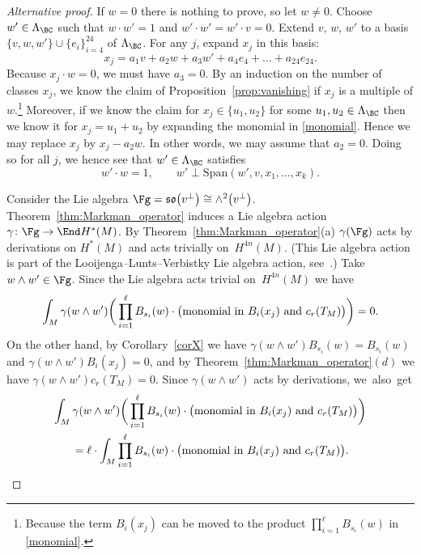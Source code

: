 \begin{proof}[Alternative proof]
If $w=0$ there is nothing to prove, so let $w \neq 0$.
Choose $w' \in \Lambda_{\BC}$ such that $w \cdot w'=1$ and $w' \cdot w' = w' \cdot v = 0$.
Extend $v$, $w$, $w'$ to a basis $\{ v, w, w' \} \cup \{ e_i \}_{i=4}^{24}$ of $\Lambda_{\BC}$.
For any $j$, expand $x_j$ in this basis:
\[
x_j = a_1 v + a_2 w + a_3 w' + a_4 e_4 + \dots + a_{24} e_{24}.
\]
Because $x_j \cdot w=0$, we must have $a_3=0$.
By an induction on the number of classes $x_j$,
we know the claim of Proposition~\ref{prop:vanishing} if $x_j$ is a multiple of $w$.\footnote{Because
the term $B_i(x_j)$ can be moved to the product $\prod_{i=1}^{\ell} B_{s_i}(w)$ in \eqref{monomial}.}
Moreover, if we know the claim for $x_j \in \{ u_1, u_2 \}$ for some $u_1, u_2 \in \Lambda_{\BC}$ then we know it for $x_j = u_1 + u_2$
by expanding the monomial in \eqref{monomial}.
Hence we may replace $x_j$ by $x_j - a_2 w$. In other words, we may assume that $a_2=0$.
Doing so for all $j$, we hence see that
$w' \in \Lambda_{\BC}$ satisfies
\[
w' \cdot w = 1, \qquad w' \perp \mathrm{Span}(w', v, x_1, \dots, x_k).
\]

Consider the Lie algebra $\Fg = \mathfrak{so}\big(v^{\perp}\big) \cong \wedge^2 \big(v^{\perp}\big)$.
Theorem~\ref{thm:Markman_operator} induces a Lie algebra action $\gamma \colon \Fg \to \End H^{\ast}(M)$.
By Theorem~\ref{thm:Markman_operator}(a) $\gamma(\Fg)$ acts by derivations on $H^{\ast}(M)$
and acts trivially on~$H^{4n}(M)$.
(This Lie algebra action is part of the Looijenga--Lunts--Verbistky Lie algebra action, see~\cite[Lemma 4.13]{Markman}.)
Take $w \wedge w' \in \Fg$. Since the Lie algebra acts trivial on~$H^{4n}(M)$ we have
\begin{equation*}
\int_{M} \gamma(w \wedge w') \bigg( \prod_{i=1}^{\ell} B_{s_i}(w) \cdot \big( \textup{monomial in } B_i(x_j) \textup{ and } c_r(T_M) \big) \bigg) = 0.
\end{equation*}
On the other hand, by Corollary~\ref{corX} we have
$\gamma(w \wedge w') B_{s_i}(w) = B_{s_i}(w)$ and $\gamma(w \wedge w') B_i(x_j) = 0$,
and by Theorem~\ref{thm:Markman_operator}$(d)$ we have $\gamma(w \wedge w') c_r(T_{M}) = 0$.
Since $\gamma(w \wedge w')$ acts by derivations, we~also~get\pagebreak
\begin{gather*}
\int_{M} \gamma(w \wedge w') \bigg( \prod_{i=1}^{\ell} B_{s_i}(w) \cdot \big( \textup{monomial in } B_i(x_j) \textup{ and } c_r(T_M) \big) \bigg)
\\ \qquad
{}= \ell \cdot \int_{M} \prod_{i=1}^{\ell} B_{s_i}(w) \cdot \big( \textup{monomial in } B_i(x_j) \textup{ and } c_r(T_M) \big). \tag*{\qed}
\end{gather*}
\renewcommand{\qed}{}
\end{proof}

